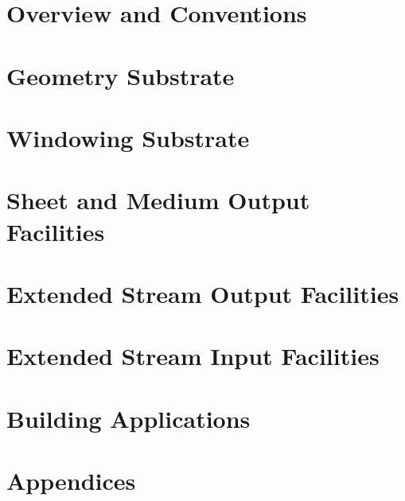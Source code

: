 \pagebreak
\setcounter{page}{1}
\renewcommand{\thepage}{\arabic{page}}

\part{Overview and Conventions}



\part{Geometry Substrate}




\part{Windowing Substrate}


\part{Sheet and Medium Output Facilities}






\part{Extended Stream Output Facilities}








\part{Extended Stream Input Facilities}






\part{Building Applications}





\part{Appendices}
\appendix








